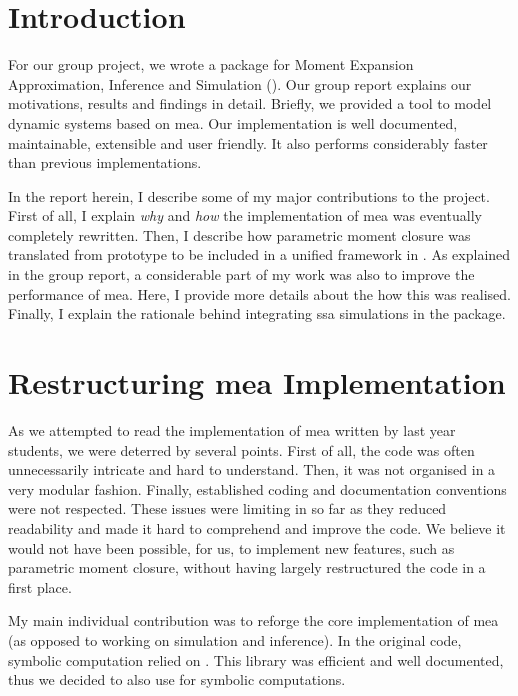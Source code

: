 
\section{Introduction}

For our group project, we wrote a \py{} package for Moment Expansion Approximation, Inference and Simulation (\means).
Our group report explains our motivations, results and findings in detail.
Briefly, we provided a tool to model dynamic systems based on \acrlong{mea}\cite{ale_general_2013}.
Our implementation is well documented, maintainable, extensible and user friendly.
It also performs considerably faster than previous implementations.

In the report herein, I describe some of my major contributions to the project.
First of all, I explain \emph{why} and \emph{how} the implementation of \acrlong{mea} was eventually completely rewritten.
Then, I describe how parametric moment closure was translated from \mat{} prototype to be included in a unified framework in \means.
As explained in the group report, a considerable part of my work was also to improve the performance of \gls{mea}.
Here, I provide more details about the how this was realised.  
Finally, I explain the rationale behind integrating \acrlong{ssa} simulations in the package.

\section{Restructuring \acrlong{mea} Implementation}
As we attempted to read the \py{} implementation of \acrshort{mea} written by last year students\cite{babtie_moment_2013},
we were deterred by several points.
First of all, the code was often unnecessarily intricate and hard to understand.
Then, it was not organised in a very modular fashion.
Finally, established \py{} coding and documentation conventions\cite{_pep_????} were not respected.
These issues were limiting in so far as they reduced readability and made it hard to comprehend and improve the code.
We believe it would not have been possible, for us, to implement new features, such as parametric moment closure,
without having largely restructured the code in a first place.

My main individual contribution was to reforge the core implementation of \acrshort{mea} (as opposed to working on simulation and inference).
In the original code, symbolic computation relied on \sympy{}\cite{sympy_development_team_sympy:_2014}.
This library was efficient and well documented, thus we decided to also use \sympy{} for symbolic computations.
 
